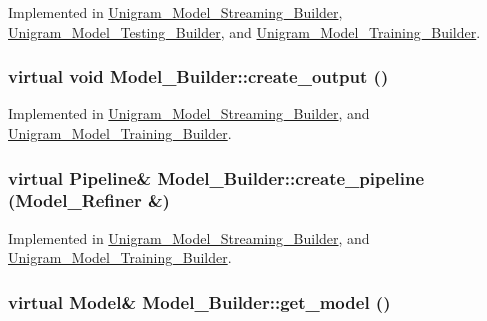 Implemented in \hyperlink{class_unigram___model___streaming___builder_a99deeb4b433573561f57df03c4d10bd2}{Unigram\_\-Model\_\-Streaming\_\-Builder}, \hyperlink{class_unigram___model___testing___builder_a694c9cb5f270cad6ff5e9d0b45da9ba6}{Unigram\_\-Model\_\-Testing\_\-Builder}, and \hyperlink{class_unigram___model___training___builder_a6693c87834917804525d1d8f4d638507}{Unigram\_\-Model\_\-Training\_\-Builder}.

\hypertarget{class_model___builder_aab7de81c31d1a76e5427023b6cb95490}{
\subsubsection[{create\_\-output}]{\setlength{\rightskip}{0pt plus 5cm}virtual void Model\_\-Builder::create\_\-output ()}}
\label{class_model___builder_aab7de81c31d1a76e5427023b6cb95490}


Implemented in \hyperlink{class_unigram___model___streaming___builder_a82ebccd666a5c8f46886323a323679e6}{Unigram\_\-Model\_\-Streaming\_\-Builder}, and \hyperlink{class_unigram___model___training___builder_a5377e0fdb76e0068a02cbc0ce5c385fb}{Unigram\_\-Model\_\-Training\_\-Builder}.

\hypertarget{class_model___builder_a6818803bf65009076dd09dcd9bb9a0b8}{
\subsubsection[{create\_\-pipeline}]{\setlength{\rightskip}{0pt plus 5cm}virtual {\bf Pipeline}\& Model\_\-Builder::create\_\-pipeline ({\bf Model\_\-Refiner} \&)}}
\label{class_model___builder_a6818803bf65009076dd09dcd9bb9a0b8}


Implemented in \hyperlink{class_unigram___model___streaming___builder_af846cbebd1061196deaae3ec1ae7e7c2}{Unigram\_\-Model\_\-Streaming\_\-Builder}, and \hyperlink{class_unigram___model___training___builder_a9f52dba1344442bc6455cf8b166f398c}{Unigram\_\-Model\_\-Training\_\-Builder}.

\hypertarget{class_model___builder_a2cd7a2ce64bdc1377f6deee168e1bcd2}{
\subsubsection[{get\_\-model}]{\setlength{\rightskip}{0pt plus 5cm}virtual {\bf Model}\& Model\_\-Builder::get\_\-model ()}}
\label{class_model___builder_a2cd7a2ce64bdc1377f6deee168e1bcd2}


